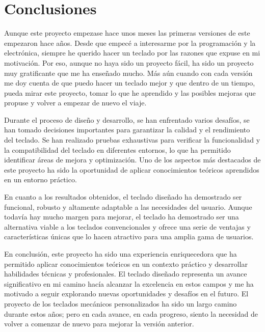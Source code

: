 \chapter{Conclusiones}

Aunque este proyecto empezase hace unos meses las primeras versiones de este empezaron hace años. Desde que empecé a interesarme por la programación y la electrónica, siempre he querido hacer un teclado por las razones que expuse en mi motivación. Por eso, aunque no haya sido un proyecto fácil, ha sido un proyecto muy gratificante que me ha enseñado mucho. Más aún cuando con cada versión me doy cuenta de que puedo hacer un teclado mejor y que dentro de un tiempo, pueda mirar este proyecto, tomar lo que he aprendido y las posibles mejoras que propuse y volver a empezar de nuevo el viaje.

Durante el proceso de diseño y desarrollo, se han enfrentado varios desafíos, se han tomado decisiones importantes para garantizar la calidad y el rendimiento del teclado. Se han realizado pruebas exhaustivas para verificar la funcionalidad y la compatibilidad del teclado en diferentes entornos, lo que ha permitido identificar áreas de mejora y optimización. Uno de los aspectos más destacados de este proyecto ha sido la oportunidad de aplicar conocimientos teóricos aprendidos en un entorno práctico.

En cuanto a los resultados obtenidos, el teclado diseñado ha demostrado ser funcional, robusto y altamente adaptable a las necesidades del usuario. Aunque todavía hay mucho margen para mejorar, el teclado ha demostrado ser una alternativa viable a los teclados convencionales y ofrece una serie de ventajas y características únicas que lo hacen atractivo para una amplia gama de usuarios.

En conclusión, este proyecto ha sido una experiencia enriquecedora que ha permitido aplicar conocimientos teóricos en un contexto práctico y desarrollar habilidades técnicas y profesionales. El teclado diseñado representa un avance significativo en mi camino hacía alcanzar la excelencia en estos campos y me ha motivado a seguir explorando nuevas oportunidades y desafíos en el futuro. El proyecto de los teclados mecánicos personalizados ha sido un largo camino durante estos años; pero en cada avance, en cada progreso, siento la necesidad de volver a comenzar de nuevo para mejorar la versión anterior.

